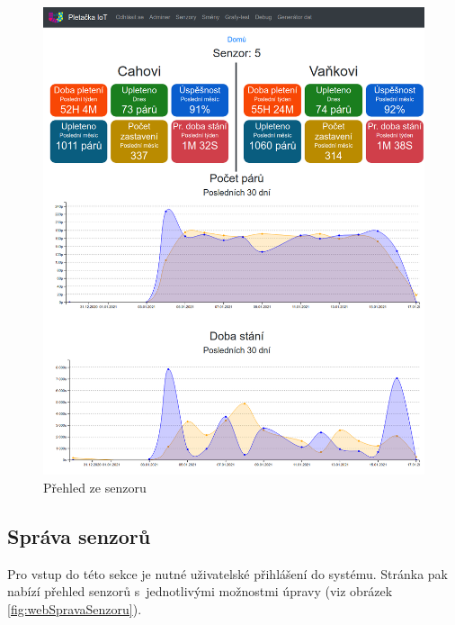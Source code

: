 \begin{figure}[htbp]
    \centering
    \includegraphics[width=\textwidth]{img/prehled.png}
    \caption{Přehled ze senzoru}
    \label{fig:webSenzory}
\end{figure}


\fxnote[author=JPA]{\textcolor{mygreen}{Aktualizovat grafy/obrázky}}


\subsection{Správa senzorů}
Pro vstup do této sekce je nutné uživatelské přihlášení do systému.
Stránka pak nabízí přehled senzorů s~jednotlivými možnostmi úpravy (viz obrázek \ref{fig:webSpravaSenzoru}).


